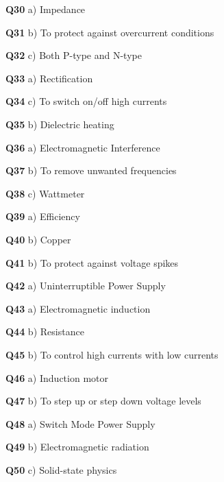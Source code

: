 \textbf{Q30} a) Impedance\par
\textbf{Q31} b) To protect against overcurrent conditions\par
\textbf{Q32} c) Both P-type and N-type\par
\textbf{Q33} a) Rectification\par
\textbf{Q34} c) To switch on/off high currents\par
\textbf{Q35} b) Dielectric heating\par
\textbf{Q36} a) Electromagnetic Interference\par
\textbf{Q37} b) To remove unwanted frequencies\par
\textbf{Q38} c) Wattmeter\par
\textbf{Q39} a) Efficiency\par
\textbf{Q40} b) Copper\par
\textbf{Q41} b) To protect against voltage spikes\par
\textbf{Q42} a) Uninterruptible Power Supply\par
\textbf{Q43} a) Electromagnetic induction\par
\textbf{Q44} b) Resistance\par
\textbf{Q45} b) To control high currents with low currents\par
\textbf{Q46} a) Induction motor\par
\textbf{Q47} b) To step up or step down voltage levels\par
\textbf{Q48} a) Switch Mode Power Supply\par
\textbf{Q49} b) Electromagnetic radiation\par
\textbf{Q50} c) Solid-state physics\par